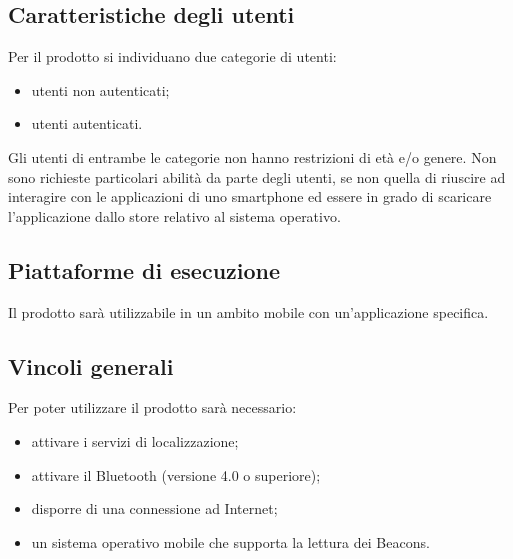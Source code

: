 	\subsection{Caratteristiche degli utenti}
	\label{sub:Caratteristiche degli utenti}
		Per il prodotto si individuano due categorie di utenti:
		\begin{itemize}
			\item utenti non autenticati;
			\item utenti autenticati.
		\end{itemize}
		Gli utenti di entrambe le categorie non hanno restrizioni di età e/o genere. Non sono richieste particolari abilità da parte degli utenti, se non quella di riuscire ad interagire con le applicazioni di uno smartphone ed essere in grado di scaricare l'applicazione dallo store relativo al sistema operativo.
		
	\subsection{Piattaforme di esecuzione}
		Il prodotto sarà utilizzabile in un ambito mobile con un'applicazione specifica.
		
	\subsection{Vincoli generali}
	Per poter utilizzare il prodotto sarà necessario:
	\begin{itemize}
		\item attivare i servizi di localizzazione;
		\item attivare il Bluetooth (versione 4.0 o superiore);
		\item disporre di una connessione ad Internet;
		\item un sistema operativo mobile che supporta la lettura dei Beacons.
	\end{itemize}